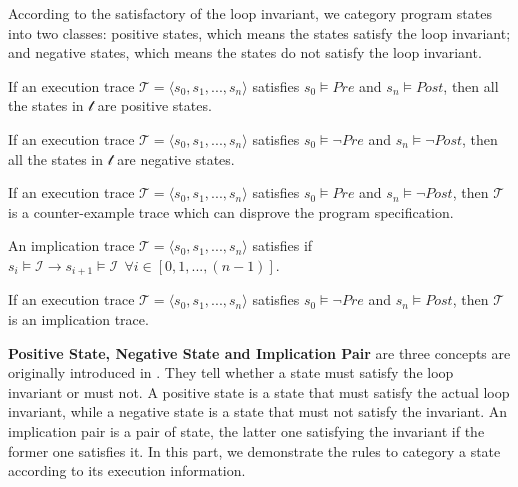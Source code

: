 According to the satisfactory of the loop invariant,
we category program states into two classes:
positive states, which means the states satisfy the loop invariant;
and negative states, which means the states do not satisfy the loop invariant.

\begin{theorem}
If an execution trace $\mathcal{T} = \langle s_0, s_1, ..., s_n\rangle$ satisfies $s_0 \models Pre$ and $s_n \models Post$,
then all the states in $\mathcal{t}$ are positive states.
\end{theorem}
\begin{theorem}
If an execution trace $\mathcal{T} = \langle s_0, s_1, ..., s_n\rangle$ satisfies $s_0 \models \neg Pre$ and $s_n \models \neg Post$,
then all the states in $\mathcal{t}$ are negative states.
\end{theorem}
\begin{theorem}
If an execution trace $\mathcal{T} = \langle s_0, s_1, ..., s_n\rangle$ satisfies $s_0 \models Pre$ and $s_n \models \neg Post$,
then $\mathcal{T}$ is a counter-example trace which can disprove the program specification.
\end{theorem}

\begin{definition}
An implication trace $\mathcal{T} = \langle s_0, s_1, ..., s_n\rangle$ satisfies if $s_i \models \mathcal{I} \rightarrow s_{i+1} \models \mathcal{I} ~~\forall i \in [0, 1, ..., (n-1)]$.
\end{definition}

\begin{theorem}
If an execution trace $\mathcal{T} = \langle s_0, s_1, ..., s_n\rangle$ satisfies $s_0 \models \neg Pre$ and $s_n \models Post$,
then $\mathcal{T}$ is an implication trace.
\end{theorem}

\medskip\noindent
\textbf{Positive State, Negative State and Implication Pair}
are three concepts are originally introduced in \cite{sharma2014invariant}.
They tell whether a state must satisfy the loop invariant or must not.
A positive state is a state that must satisfy the actual loop invariant,
while a negative state is a state that must not satisfy the invariant.
An implication pair is a pair of state, the latter one satisfying the invariant 
if the former one satisfies it. 
In this part, we demonstrate the rules to category a state according to its execution information.

